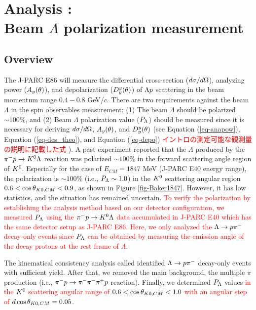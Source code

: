 %
\graphicspath{{./pictures/chapter_Pl/}}

\chapter{Analysis : \\Beam $\Lambda$ polarization measurement} 
\label{chap-Pl}

\section{Overview}

The J-PARC E86 will measure the differential cross-section ($d\sigma/d\Omega$), analyzing power ($A_{y}(\theta)$), and depolarization ($D^{y}_{y}(\theta)$) of $\Lambda p$ scattering in the beam momentum range $0.4-0.8$ GeV/$c$. There are two requirements against the beam $\Lambda$ in the spin observables measurement: (1) The beam $\Lambda$ should be polarized $\sim100$\%, and (2) Beam $\Lambda$ polarization value ($P_{\Lambda}$) should be measured since it is necessary for deriving $d\sigma/d\Omega$, $A_{y}(\theta)$, and $D^{y}_{y}(\theta)$ (see Equation (\ref{eq-anapow}), Equation (\ref{eq-dcs_theo}), and Equation (\ref{eq-depo}) \textcolor{red}{ イントロの測定可能な観測量の説明に記載した式 }). A past experiment \cite{Baker} reported that the $\Lambda$ produced by the $\pi^- p \to K^0 \Lambda$ reaction was polarized $\sim100$\% in the forward scattering angle region of $K^{0}$. Especially for the case of $E_{CM}=1847$ MeV (J-PARC E40 energy range), the polarization is $\sim100$\% (i.e., $P_{\Lambda}\sim1.0$) in the $K^{0}$ scattering angular region $0.6<\cos{\theta_{K0,CM}}<0.9$, as shown in Figure \ref{fig-Baker1847}. However, it has low statistics, and the situation has remained uncertain. \textcolor{red}{ To verify the polarization by establishing the analysis method based on our detector configuration, we measured $P_{\Lambda}$ using the $\pi^- p \to K^0 \Lambda$ data accumulated in J-PARC E40 which has the same detector setup as J-PARC E86. Here, we only analyzed the $\Lambda\to p\pi^{-}$ decay-only events since $P_{\Lambda}$ can be obtained by measuring the emission angle of the decay protons at the \textcolor{red}{ rest frame } of $\Lambda$. }

The kinematical consistency analysis called  identified $\Lambda\to p\pi^{-}$ decay-only events with sufficient yield. After that, we removed the main background, the multiple $\pi$ production (i.e., $\pi^- p \to \pi^-\pi^-\pi^+p$ reaction). Finally, we determined $P_{\Lambda}$ values \textcolor{red}{ in the $K^{0}$ scattering angular range of $0.6<\cos{\theta_{K0,CM}}<1.0$ with an angular step of $d\cos{\theta_{K0,CM}}=0.05$.} %

